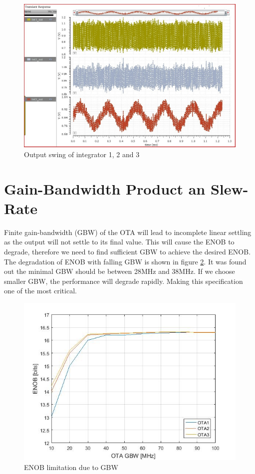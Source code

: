 \begin{figure}[h]
\centering
\includegraphics[scale=0.45]{images/output_swing.jpg}
\caption{Output swing of integrator 1, 2 and 3}
\label{fig:output_swing}
\end{figure}

\section{Gain-Bandwidth Product an Slew-Rate}

Finite gain-bandwidth (GBW) of the OTA will lead to incomplete linear settling as the output will not settle to its final value. This will cause the ENOB to degrade, therefore we need to find sufficient GBW to achieve the desired ENOB. The degradation of ENOB with falling GBW is shown in figure \ref{fig:GBW_spec}. It was found out the minimal GBW should be between 28MHz and 38MHz. If we choose smaller GBW, the performance will degrade rapidly. Making this specification one of the most critical.

\begin{figure}[h]
\centering
\includegraphics[scale=0.55]{images/GBW_spec.jpg}
\caption{ENOB limitation due to GBW}
\label{fig:GBW_spec}
\end{figure}

